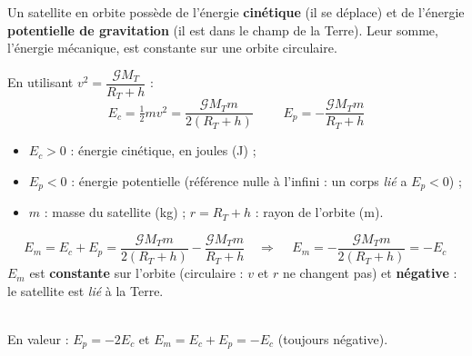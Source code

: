 \documentclass[11pt,a4paper]{article}
\begin{document}

Un satellite en orbite possède de l'énergie \textbf{cinétique} (il se déplace) et de
l'énergie \textbf{potentielle de gravitation} (il est dans le champ de la Terre). Leur
somme, l'énergie mécanique, est constante sur une orbite circulaire.

\begin{cle}
En utilisant $v^2=\dfrac{\mathcal{G}M_T}{R_T+h}$ :
\[
\boxed{\,E_c=\tfrac12 m v^2=\dfrac{\mathcal{G}M_T m}{2(R_T+h)}\,}\qquad
\boxed{\,E_p=-\dfrac{\mathcal{G}M_T m}{R_T+h}\,}
\]
\begin{itemize}[leftmargin=1.5em,topsep=1pt,itemsep=0pt]
  \item $E_c>0$ : énergie cinétique, en joules (\si{\joule}) ;
  \item $E_p<0$ : énergie potentielle (référence nulle à l'infini : un corps
        \emph{lié} a $E_p<0$) ;
  \item $m$ : masse du satellite (\si{\kilogram}) ; \; $r=R_T+h$ : rayon de l'orbite (\si{\metre}).
\end{itemize}
\end{cle}

\begin{cle}[énergie mécanique : $E_m=-E_c$]
\[
E_m=E_c+E_p=\frac{\mathcal{G}M_T m}{2(R_T+h)}-\frac{\mathcal{G}M_T m}{R_T+h}
\quad\Longrightarrow\quad
\boxed{\,E_m=-\dfrac{\mathcal{G}M_T m}{2(R_T+h)}=-E_c\,}
\]
$E_m$ est \textbf{constante} sur l'orbite (circulaire : $v$ et $r$ ne changent pas) et
\textbf{négative} : le satellite est \emph{lié} à la Terre.
\end{cle}

\begin{center}
\\[-1pt]
{\footnotesize En valeur : $E_p=-2E_c$ et $E_m=E_c+E_p=-E_c$ (toujours négative).}
\end{center}
\end{document}
